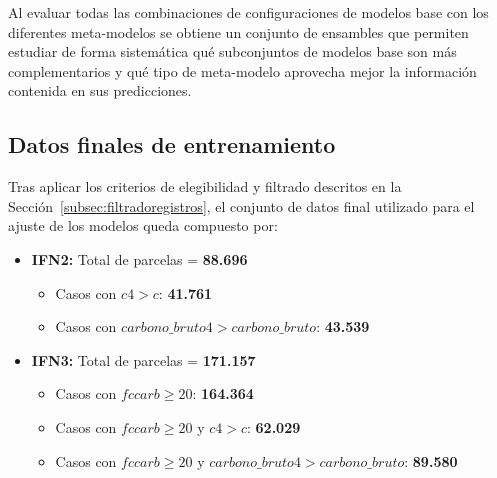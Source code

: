 \begin{table}
    \centering
    \caption{Meta-modelos utilizados en el \textit{stacking} junto con sus parámetros.}
    \label{tab:meta_modelos}
    \footnotesize
\end{table}

Al evaluar todas las combinaciones de configuraciones de modelos base con los diferentes meta-modelos se obtiene un conjunto de ensambles que permiten estudiar de forma sistemática qué subconjuntos de modelos base son más complementarios y qué tipo de meta-modelo aprovecha mejor la información contenida en sus predicciones.


\subsection{Datos finales de entrenamiento}
\label{subsec:datos_finales_entrenamiento}

Tras aplicar los criterios de elegibilidad y filtrado descritos en la
Sección~\ref{subsec:filtradoregistros}, el conjunto de datos final utilizado
para el ajuste de los modelos queda compuesto por:

\begin{itemize}
    \item \textbf{IFN2:} Total de parcelas = \textbf{88.696}
          \begin{itemize}
              \item Casos con $c4 > c$: \textbf{41.761}
              \item Casos con $carbono\_bruto4 > carbono\_bruto$: \textbf{43.539}
          \end{itemize}

    \item \textbf{IFN3:} Total de parcelas = \textbf{171.157}
          \begin{itemize}
              \item Casos con $fccarb \geq 20$: \textbf{164.364}
              \item Casos con $fccarb \geq 20$ y $c4 > c$: \textbf{62.029}
              \item Casos con $fccarb \geq 20$ y $carbono\_bruto4 > carbono\_bruto$: \textbf{89.580}
          \end{itemize}
\end{itemize}

